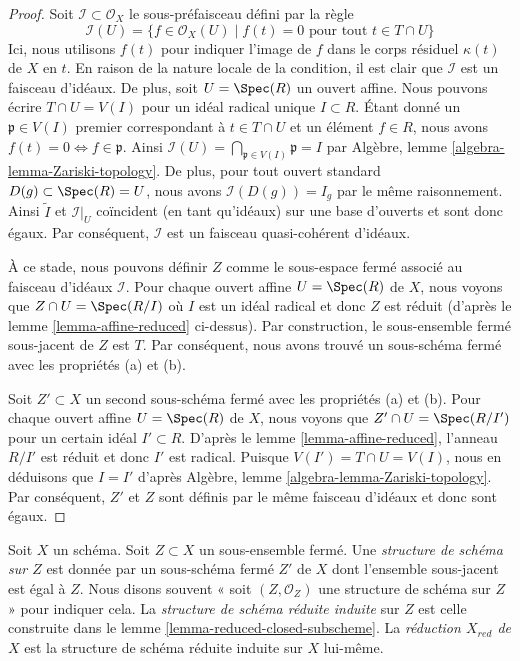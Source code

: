 \begin{proof}
Soit $\mathcal{I} \subset \mathcal{O}_X$ le sous-préfaisceau
défini par la règle
$$
\mathcal{I}(U) = \{f \in \mathcal{O}_X(U) \mid
f(t) = 0\text{ pour tout }t \in T\cap U\}
$$
Ici, nous utilisons $f(t)$ pour indiquer l'image
de $f$ dans le corps résiduel $\kappa(t)$ de $X$ en $t$.
En raison de la nature locale de la condition, il est
clair que $\mathcal{I}$ est un faisceau d'idéaux. De plus,
soit $U = \Spec(R)$ un ouvert affine. Nous
pouvons écrire $T \cap U = V(I)$ pour un idéal radical
unique $I \subset R$. Étant donné un $\mathfrak p \in V(I)$
premier correspondant à $t \in T \cap U$ et un élément $f \in R$, nous avons
$f(t) = 0 \Leftrightarrow f \in \mathfrak p$.
Ainsi $\mathcal{I}(U) = \bigcap_{\mathfrak p \in V(I)} \mathfrak p = I$ par
Algèbre, lemme \ref{algebra-lemma-Zariski-topology}. De plus, pour
tout ouvert standard $D(g) \subset \Spec(R) = U$, nous avons
$\mathcal{I}(D(g)) = I_g$ par le même raisonnement. Ainsi $\widetilde
I$ et $\mathcal{I}|_U$ coïncident (en tant qu'idéaux) sur
une base d'ouverts et sont donc égaux. Par conséquent,
$\mathcal{I}$ est un faisceau quasi-cohérent d'idéaux.

\medskip\noindent
À ce stade, nous pouvons définir $Z$ comme le sous-espace fermé
associé au faisceau d'idéaux $\mathcal{I}$. Pour chaque ouvert
affine $U = \Spec(R)$ de $X$, nous voyons que $Z \cap
U = \Spec(R/I)$ où $I$ est un idéal radical et donc $Z$ est
réduit (d'après le lemme \ref{lemma-affine-reduced} ci-dessus). Par construction,
le sous-ensemble fermé sous-jacent de $Z$ est $T$. Par conséquent,
nous avons trouvé un sous-schéma fermé avec les propriétés (a) et (b).

\medskip\noindent
Soit $Z' \subset X$ un second sous-schéma fermé avec les propriétés (a) et (b). Pour
chaque ouvert affine $U = \Spec(R)$ de $X$, nous voyons que $Z'
\cap U = \Spec(R/I')$ pour un certain idéal $I' \subset R$.
D'après le lemme \ref{lemma-affine-reduced}, l'anneau $R/I'$ est
réduit et donc $I'$ est radical. Puisque $V(I') = T \cap U = V(I)$, nous
en déduisons que $I = I'$ d'après
Algèbre, lemme \ref{algebra-lemma-Zariski-topology}. Par
conséquent, $Z'$ et $Z$ sont définis par le même faisceau d'idéaux
et donc sont égaux.
\end{proof}

\begin{definition}
\label{definition-reduced-induced-scheme}
Soit $X$ un schéma. Soit $Z \subset X$ un sous-ensemble fermé. Une
{\it structure de schéma sur $Z$} est donnée par un sous-schéma fermé $Z'$
de $X$ dont l'ensemble sous-jacent est égal à $Z$. Nous disons
souvent « soit $(Z, \mathcal{O}_Z)$ une structure de schéma sur
$Z$ » pour indiquer cela. La {\it structure de schéma réduite
induite} sur $Z$ est celle construite dans le lemme \ref{lemma-reduced-closed-subscheme}.
La {\it réduction $X_{red}$ de $X$} est la structure de schéma réduite
induite sur $X$ lui-même.
\end{definition}

